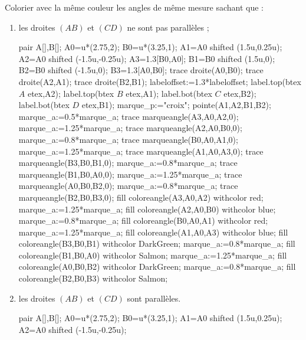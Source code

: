  \begin{corrige}
   Colorier avec la même couleur les angles de même mesure sachant que :
   \begin{enumerate}
     \item les droites $(AB)$ et $(CD)$ ne sont pas parallèles ;
     \begin{Geometrie}[CoinHD={(5.5u,3u)}]
         pair A[],B[];
         A0=u*(2.75,2);
         B0=u*(3.25,1);
         A1=A0 shifted (1.5u,0.25u);
         A2=A0 shifted (-1.5u,-0.25u);
         A3=1.3[B0,A0];
         B1=B0 shifted (1.5u,0);
         B2=B0 shifted (-1.5u,0);
         B3=1.3[A0,B0];
         trace droite(A0,B0);
         trace droite(A2,A1);
         trace droite(B2,B1);
         labeloffset:=1.3*labeloffset;
         label.top(btex $A$ etex,A2);
         label.top(btex $B$ etex,A1);
         label.bot(btex $C$ etex,B2);
         label.bot(btex $D$ etex,B1);         
         marque_p:="croix";
         pointe(A1,A2,B1,B2);
         marque_a:=0.5*marque_a;
         trace marqueangle(A3,A0,A2,0);
         marque_a:=1.25*marque_a;
         trace marqueangle(A2,A0,B0,0);
         marque_a:=0.8*marque_a;
         trace marqueangle(B0,A0,A1,0);
         marque_a:=1.25*marque_a;
         trace marqueangle(A1,A0,A3,0);
         trace marqueangle(B3,B0,B1,0);
         marque_a:=0.8*marque_a;
         trace marqueangle(B1,B0,A0,0);
         marque_a:=1.25*marque_a;
         trace marqueangle(A0,B0,B2,0);
         marque_a:=0.8*marque_a;
         trace marqueangle(B2,B0,B3,0);
         fill coloreangle(A3,A0,A2) withcolor red;
         marque_a:=1.25*marque_a;
         fill coloreangle(A2,A0,B0) withcolor blue;
         marque_a:=0.8*marque_a;
         fill coloreangle(B0,A0,A1) withcolor red;
         marque_a:=1.25*marque_a;
         fill coloreangle(A1,A0,A3) withcolor blue;
         fill coloreangle(B3,B0,B1) withcolor DarkGreen;
         marque_a:=0.8*marque_a;
         fill coloreangle(B1,B0,A0) withcolor Salmon;
         marque_a:=1.25*marque_a;
         fill coloreangle(A0,B0,B2) withcolor DarkGreen;
         marque_a:=0.8*marque_a;
         fill coloreangle(B2,B0,B3) withcolor Salmon;
      \end{Geometrie}
     \item les droites $(AB)$ et $(CD)$ sont parallèles.
      \begin{Geometrie}[CoinHD={(5.5u,3u)}]
         pair A[],B[];
         A0=u*(2.75,2);
         B0=u*(3.25,1);
         A1=A0 shifted (1.5u,0.25u);
         A2=A0 shifted (-1.5u,-0.25u);

\end{Geometrie}
\end{enumerate}
\end{corrige}
